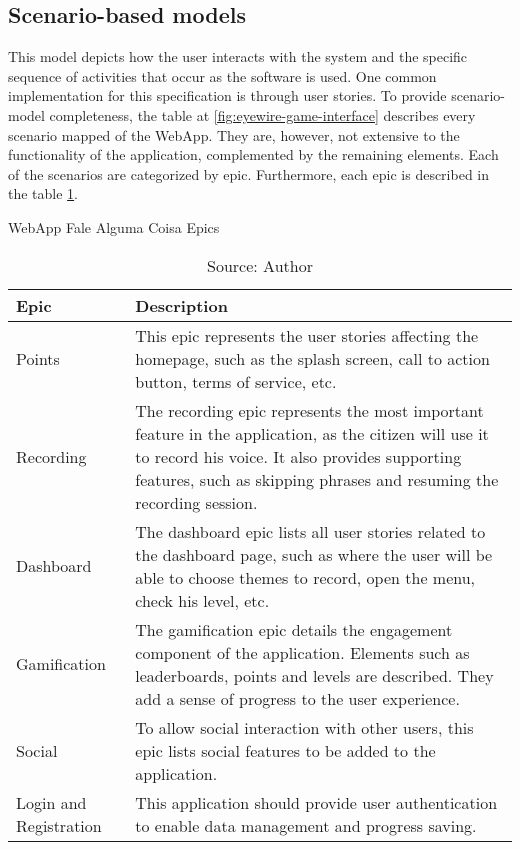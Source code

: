\subsection{Scenario-based models}

This model depicts how the user interacts with the system and the specific sequence of activities that occur as the software is used. One common implementation for this specification is through user stories. To provide scenario-model completeness, the table at \ref{fig:eyewire-game-interface} describes every scenario mapped of the WebApp. They are, however, not extensive to the functionality of the application, complemented by the remaining elements. Each of the scenarios are categorized by epic. Furthermore, each epic is described in the table \ref{tab:falealgumacoisa-epics}.

\begin{table}[h]
    \centering
    \caption{WebApp Fale Alguma Coisa Epics}
    \label{tab:falealgumacoisa-epics}
    \begin{tabular}{|p{3cm}|p{10cm}|}
        \hline Epic & Description \\
        \hline Points & This epic represents the user stories affecting the homepage, such as the splash screen, call to action button, terms of service, etc. \\
        \hline Recording & The recording epic represents the most important feature in the application, as the citizen will use it to record his voice. It also provides supporting features, such as skipping phrases and resuming the recording session.\\ 
        \hline Dashboard & The dashboard epic lists all user stories related to the dashboard page, such as where the user will be able to choose themes to record, open the menu, check his level, etc. \\
        \hline Gamification & The gamification epic details the engagement component of the application. Elements such as leaderboards, points and levels are described. They add a sense of progress to the user experience. \\
        \hline Social & To allow social interaction with other users, this epic lists social features to be added to the application. \\
        \hline Login and Registration & This application should provide user authentication to enable data management and progress saving. \\
        \hline
    \end{tabular}
    \caption*{Source: Author}
\end{table}

